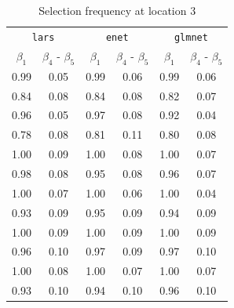 \documentclass[authoryear, review, 11pt]{elsarticle}
\begin{document}
		\begin{table}[ht]
		\begin{center}
		\begin{tabular}{cc|cc|cc}
		\multicolumn{2}{c}{\texttt{lars}} & \multicolumn{2}{c}{\texttt{enet}} & \multicolumn{2}{c}{\texttt{glmnet}} \\
		 $\beta_1$ & $\beta_4$ - $\beta_5$ & $\beta_1$ & $\beta_4$ - $\beta_5$ & $\beta_1$ & $\beta_4$ - $\beta_5$ \\ 
		  \hline
		0.99 & 0.05 & 0.99 & 0.06 & 0.99 & 0.06 \\ 
		  0.84 & 0.08 & 0.84 & 0.08 & 0.82 & 0.07 \\ 
		  0.96 & 0.05 & 0.97 & 0.08 & 0.92 & 0.04 \\ 
		  0.78 & 0.08 & 0.81 & 0.11 & 0.80 & 0.08 \\ 
		  \hline
		  1.00 & 0.09 & 1.00 & 0.08 & 1.00 & 0.07 \\ 
		  0.98 & 0.08 & 0.95 & 0.08 & 0.96 & 0.07 \\ 
		  1.00 & 0.07 & 1.00 & 0.06 & 1.00 & 0.04 \\ 
		  0.93 & 0.09 & 0.95 & 0.09 & 0.94 & 0.09 \\ 
		  \hline
		  1.00 & 0.09 & 1.00 & 0.09 & 1.00 & 0.09 \\ 
		  0.96 & 0.10 & 0.97 & 0.09 & 0.97 & 0.10 \\ 
		  1.00 & 0.08 & 1.00 & 0.07 & 1.00 & 0.07 \\ 
		  0.93 & 0.10 & 0.94 & 0.10 & 0.96 & 0.10 \\ 
		  \end{tabular}
		\caption{Selection frequency at location 3\label{table:loc3-selection}}
		\end{center}
		\end{table}
\end{document}
